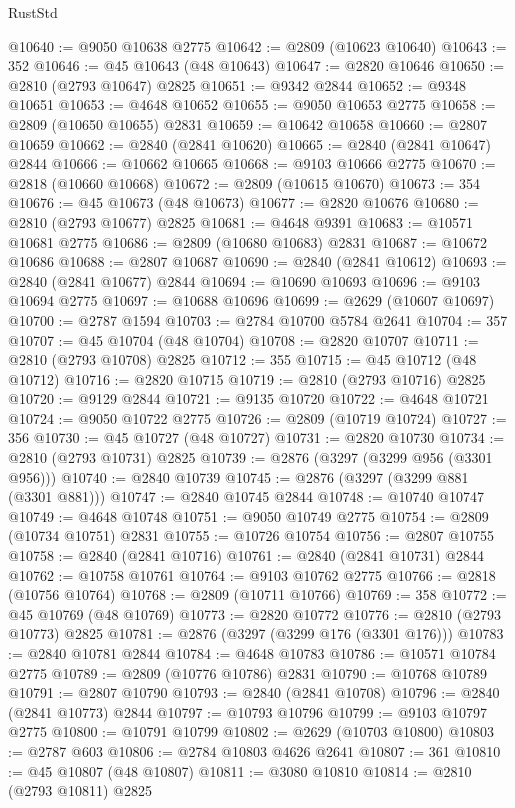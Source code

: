 \begin{lexlean}{RustStd}
\begin{coremodule}
@10640 := @9050 @10638 @2775
@10642 := @2809 (@10623 @10640)
@10643 := 352
@10646 := @45 @10643 (@48 @10643)
@10647 := @2820 @10646
@10650 := @2810 (@2793 @10647) @2825
@10651 := @9342 @2844
@10652 := @9348 @10651
@10653 := @4648 @10652
@10655 := @9050 @10653 @2775
@10658 := @2809 (@10650 @10655) @2831
@10659 := @10642 @10658
@10660 := @2807 @10659
@10662 := @2840 (@2841 @10620)
@10665 := @2840 (@2841 @10647) @2844
@10666 := @10662 @10665
@10668 := @9103 @10666 @2775
@10670 := @2818 (@10660 @10668)
@10672 := @2809 (@10615 @10670)
@10673 := 354
@10676 := @45 @10673 (@48 @10673)
@10677 := @2820 @10676
@10680 := @2810 (@2793 @10677) @2825
@10681 := @4648 @9391
@10683 := @10571 @10681 @2775
@10686 := @2809 (@10680 @10683) @2831
@10687 := @10672 @10686
@10688 := @2807 @10687
@10690 := @2840 (@2841 @10612)
@10693 := @2840 (@2841 @10677) @2844
@10694 := @10690 @10693
@10696 := @9103 @10694 @2775
@10697 := @10688 @10696
@10699 := @2629 (@10607 @10697)
@10700 := @2787 @1594
@10703 := @2784 @10700 @5784 @2641
@10704 := 357
@10707 := @45 @10704 (@48 @10704)
@10708 := @2820 @10707
@10711 := @2810 (@2793 @10708) @2825
@10712 := 355
@10715 := @45 @10712 (@48 @10712)
@10716 := @2820 @10715
@10719 := @2810 (@2793 @10716) @2825
@10720 := @9129 @2844
@10721 := @9135 @10720
@10722 := @4648 @10721
@10724 := @9050 @10722 @2775
@10726 := @2809 (@10719 @10724)
@10727 := 356
@10730 := @45 @10727 (@48 @10727)
@10731 := @2820 @10730
@10734 := @2810 (@2793 @10731) @2825
@10739 := @2876 (@3297 (@3299 @956 (@3301 @956)))
@10740 := @2840 @10739
@10745 := @2876 (@3297 (@3299 @881 (@3301 @881)))
@10747 := @2840 @10745 @2844
@10748 := @10740 @10747
@10749 := @4648 @10748
@10751 := @9050 @10749 @2775
@10754 := @2809 (@10734 @10751) @2831
@10755 := @10726 @10754
@10756 := @2807 @10755
@10758 := @2840 (@2841 @10716)
@10761 := @2840 (@2841 @10731) @2844
@10762 := @10758 @10761
@10764 := @9103 @10762 @2775
@10766 := @2818 (@10756 @10764)
@10768 := @2809 (@10711 @10766)
@10769 := 358
@10772 := @45 @10769 (@48 @10769)
@10773 := @2820 @10772
@10776 := @2810 (@2793 @10773) @2825
@10781 := @2876 (@3297 (@3299 @176 (@3301 @176)))
@10783 := @2840 @10781 @2844
@10784 := @4648 @10783
@10786 := @10571 @10784 @2775
@10789 := @2809 (@10776 @10786) @2831
@10790 := @10768 @10789
@10791 := @2807 @10790
@10793 := @2840 (@2841 @10708)
@10796 := @2840 (@2841 @10773) @2844
@10797 := @10793 @10796
@10799 := @9103 @10797 @2775
@10800 := @10791 @10799
@10802 := @2629 (@10703 @10800)
@10803 := @2787 @603
@10806 := @2784 @10803 @4626 @2641
@10807 := 361
@10810 := @45 @10807 (@48 @10807)
@10811 := @3080 @10810
@10814 := @2810 (@2793 @10811) @2825

\end{coremodule}
\end{lexlean}
